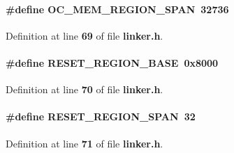 \paragraph[{O\+C\+\_\+\+M\+E\+M\+\_\+\+R\+E\+G\+I\+O\+N\+\_\+\+S\+P\+AN}]{\setlength{\rightskip}{0pt plus 5cm}\#define O\+C\+\_\+\+M\+E\+M\+\_\+\+R\+E\+G\+I\+O\+N\+\_\+\+S\+P\+AN~32736}\label{linker_8h_a90b625e5698f38a63e46b2d66fe86294}


Definition at line {\bf 69} of file {\bf linker.\+h}.

\paragraph[{R\+E\+S\+E\+T\+\_\+\+R\+E\+G\+I\+O\+N\+\_\+\+B\+A\+SE}]{\setlength{\rightskip}{0pt plus 5cm}\#define R\+E\+S\+E\+T\+\_\+\+R\+E\+G\+I\+O\+N\+\_\+\+B\+A\+SE~0x8000}\label{linker_8h_aa81f71bbd322c0bc7fd5cfed499db1a7}


Definition at line {\bf 70} of file {\bf linker.\+h}.

\paragraph[{R\+E\+S\+E\+T\+\_\+\+R\+E\+G\+I\+O\+N\+\_\+\+S\+P\+AN}]{\setlength{\rightskip}{0pt plus 5cm}\#define R\+E\+S\+E\+T\+\_\+\+R\+E\+G\+I\+O\+N\+\_\+\+S\+P\+AN~32}\label{linker_8h_adccca8a9535f09c7650f7ac2c81ed8c7}


Definition at line {\bf 71} of file {\bf linker.\+h}.

